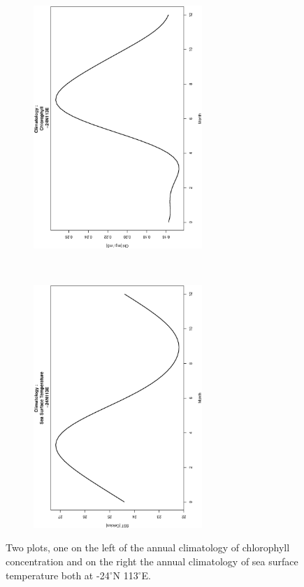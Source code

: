 \begin{figure}[h]
    \centering
    \begin{subfigure}[t]{0.5\textwidth}
        \centering
        \includegraphics[width=0.7\textwidth, angle =-90]{Chapter3/-24,113/Data_-24N113E_Chl_Climatology.eps}
    \end{subfigure}%
    ~ 
    \begin{subfigure}[t]{0.5\textwidth}
        \centering
        \includegraphics[width=0.7\textwidth, angle =-90]{Chapter3/-24,113/Data_-24N113E_SST_Climatology.eps}
    \end{subfigure}
    \caption{Two plots, one on the left of the annual climatology of chlorophyll concentration and on the right the annual climatology of sea surface temperature both at -24$^{\circ}$N 113$^{\circ}$E.}\label{fig:clim-24,113}
\end{figure}

